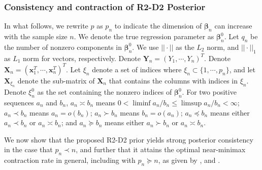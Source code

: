 \documentclass[12pt]{article}
\begin{document}
\subsubsection{Consistency and contraction of R2-D2 Posterior}\label{Section_posterior consistency}

In what follows, we rewrite   $p$ as $p_n$ to indicate the dimension of $\bm{\beta}_n$ can increase with the sample size $n$.
We denote the true regression parameter as  $ \bm{\beta}^0_n$.
Let $q_n$ be the number of nonzero components in   $ \bm\beta^0_n$.
We use $||\cdot||$ as the $L_2$  norm,   and $||\cdot||_1$ as $L_1$ norm for vectors, respectively.
Denote $\bm Y_n =  (Y_1, \cdots, Y_n)^T$.
Denote $\bm X_n = ({{\bm{x}}}_1^T, \cdots, {{\bm{x}}}_n^T)^T$.
Let $\xi_n$ denote a set of indices where $\xi_n \subset  \{1, \cdots, p_n \}$, and let $\bm{X}_{\xi_n}$ denote the sub-matrix of ${\bm X}_n$ that contains the columns with indices in $\xi_n$.
Denote $\xi^0_n$  as the set containing  the nonzero indices of $\bm{\beta}^0_n$.
For two positive sequences $a_n$ and $b_n$,
$a_n\asymp b_n$ means $0<\liminf a_n/b_n \leq \limsup a_n/b_n<\infty$;
$a_n\prec b_n$ means $a_n = o(b_n)$;
$a_n\succ b_n$ means $b_n = o(a_n)$;
$a_n\preceq b_n$ means either $a_n  \prec b_n$ or $a_n \asymp b_n$;
and $a_n\succeq b_n$ means either $a_n  \succ b_n$ or $a_n \asymp b_n$.

We now show that  the proposed R2-D2 prior     yields   strong posterior consistency in the case that $p_n \prec n$, and further that it attains the optimal near-minimax contraction rate in general, including with  $p_n\succeq n$, as given by \cite{castillo2015bayesian}, \cite{song2017nearly} and \cite{rovckova2018spike}.
\end{document}
